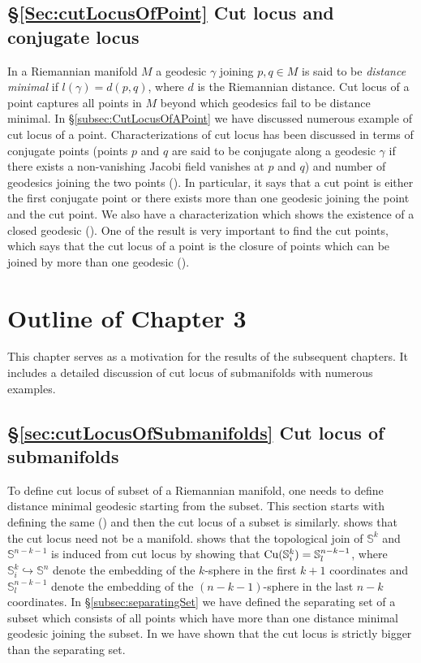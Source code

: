 \subsection*{\S \ref{Sec:cutLocusOfPoint} Cut locus and conjugate locus}
\hfb In a Riemannian manifold $M$ a geodesic $\gamma$ joining $p,q\in M$ is said to be \textit{distance minimal} if $l(\gamma)=d(p,q)$, where $d$ is the Riemannian distance. Cut locus of a point captures all points in $M$ beyond which geodesics fail to be distance minimal. In \S\ref{subsec:CutLocusOfAPoint} we have discussed numerous example of cut locus of a point. Characterizations of cut locus has been discussed in terms of conjugate points (points $p$ and $q$ are said to be conjugate along a geodesic $\gamma$ if there exists a non-vanishing Jacobi field vanishes at $p$ and $q$) and number of geodesics joining the two points (). In particular, it says that a cut point is either the first conjugate point or there exists more than one geodesic joining the point and the cut point. We also have a characterization which shows the existence of a closed geodesic (). One of the result \cite[Theorem 1]{Wol79} is very important to find the cut points, which says that the cut locus of a point is the closure of points which can be joined by more than one geodesic ().

\section{Outline of Chapter 3}
\hfb This chapter serves as a motivation for the results of the subsequent chapters. It includes a detailed discussion of cut locus of submanifolds with numerous examples.

\subsection*{\S\ref{sec:cutLocusOfSubmanifolds} Cut locus of submanifolds}
\hfb To define cut locus of subset of a Riemannian manifold, one needs to define distance minimal geodesic starting from the subset. This section starts with defining the same () and then the cut locus of a subset is similarly.  shows that the cut locus need not be a manifold.  shows that the topological join of $\mathbb{S}^k$ and $\mathbb{S}^{n-k-1}$ is induced from cut locus by showing that $\cutn[\mathbb{S}^k_i] = \mathbb{S}^{n-k-1}_l$, where $\mathbb{S}_i^k \hookrightarrow \mathbb{S}^n$ denote the embedding of the $k$-sphere in the first $k+1$ coordinates and $\mathbb{S}^{n-k-1}_l$ denote the embedding of the $(n-k-1)$-sphere in the last $n-k$ coordinates. In \S \ref{subsec:separatingSet} we have defined the separating set of a subset which consists of all points which have more than one distance minimal geodesic joining the subset. In  we have shown that the cut locus is strictly bigger than the separating set. 

